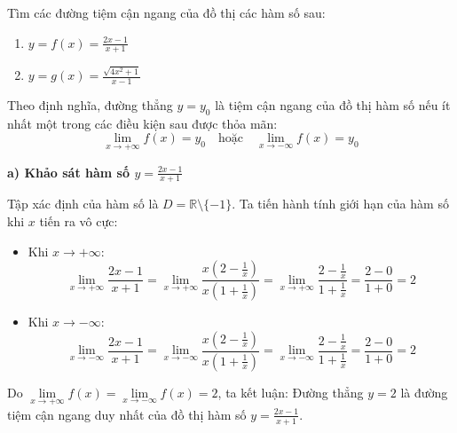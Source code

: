 \documentclass[12pt]{article}
\begin{document}
	\begin{vidu}[1]
		Tìm các đường tiệm cận ngang của đồ thị các hàm số sau:
		\begin{enumerate}[label=\textbf{\alph*)}]
			\item $y = f(x) = \frac{2x - 1}{x + 1}$
			\item $y = g(x) = \frac{\sqrt{4x^2 + 1}}{x - 1}$
		\end{enumerate}
	\end{vidu}
	
	\begin{loigiai}
		Theo định nghĩa, đường thẳng $y = y_0$ là tiệm cận ngang của đồ thị hàm số nếu ít nhất một trong các điều kiện sau được thỏa mãn:
		\[ \lim_{x \to +\infty} f(x) = y_0 \quad \text{hoặc} \quad \lim_{x \to -\infty} f(x) = y_0 \]
		
		\textbf{a) Khảo sát hàm số $y = \frac{2x - 1}{x + 1}$}
		
		Tập xác định của hàm số là $D = \mathbb{R} \setminus \{-1\}$. Ta tiến hành tính giới hạn của hàm số khi $x$ tiến ra vô cực:
		\begin{itemize}
			\item Khi $x \to +\infty$:
			\[ \lim_{x \to +\infty} \frac{2x - 1}{x + 1} = \lim_{x \to +\infty} \frac{x\left(2 - \frac{1}{x}\right)}{x\left(1 + \frac{1}{x}\right)} = \lim_{x \to +\infty} \frac{2 - \frac{1}{x}}{1 + \frac{1}{x}} = \frac{2 - 0}{1 + 0} = 2 \]
			\item Khi $x \to -\infty$:
			\[ \lim_{x \to -\infty} \frac{2x - 1}{x + 1} = \lim_{x \to -\infty} \frac{x\left(2 - \frac{1}{x}\right)}{x\left(1 + \frac{1}{x}\right)} = \lim_{x \to -\infty} \frac{2 - \frac{1}{x}}{1 + \frac{1}{x}} = \frac{2 - 0}{1 + 0} = 2 \]
		\end{itemize}
		Do $\lim\limits_{x \to +\infty} f(x) = \lim\limits_{x \to -\infty} f(x) = 2$, ta kết luận: Đường thẳng $y = 2$ là đường tiệm cận ngang duy nhất của đồ thị hàm số $y = \frac{2x - 1}{x + 1}$.
		
		\begin{figure}[H]
			\centering
\end{figure}
\end{loigiai}
\end{document}
